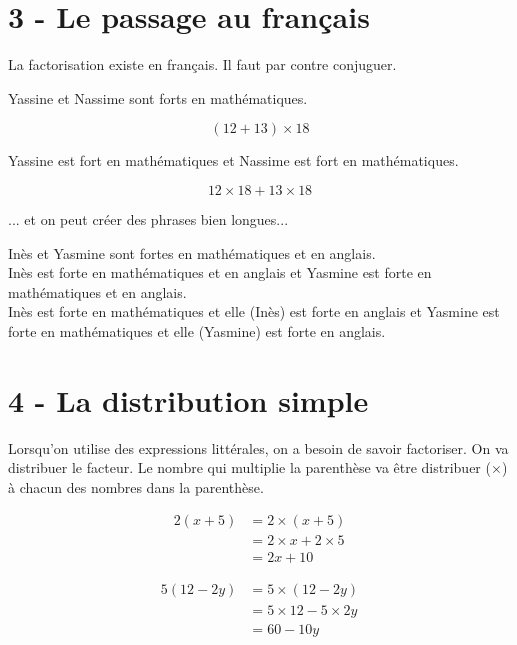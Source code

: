 \documentclass[11pt]{article}
\begin{document}
\section*{3 - Le passage au français}

La factorisation existe en français. Il faut par contre conjuguer.

\begin{center}
  {\selectfont 
  Yassine et Nassime sont forts en mathématiques. 
  }
\end{center}

$$(12 + 13) \times 18$$

\begin{center}
  {\selectfont 
  Yassine est fort en mathématiques et Nassime est fort en mathématiques. 
  }
\end{center}

$$12 \times 18 + 13 \times 18$$

... et on peut créer des phrases bien longues... 

\begin{center}
  {\selectfont 
  Inès et Yasmine sont fortes en mathématiques et en anglais. \\
  Inès est forte en mathématiques et en anglais et Yasmine est forte en mathématiques et en anglais. \\
  Inès est forte en mathématiques et elle (Inès) est forte en anglais et Yasmine est forte en mathématiques et elle (Yasmine) est forte en anglais.  
  }
\end{center}


\section*{4 - La distribution simple}

Lorsqu'on utilise des expressions littérales, on a besoin de savoir factoriser. On va distribuer le facteur. Le nombre qui multiplie la parenthèse va être distribuer ($\times$) à chacun des nombres dans la parenthèse.
\begin{multicols}{2}
\begin{align*}
  2(x + 5 ) &= 2 \times (x + 5 ) \\
            &= 2 \times x + 2 \times 5 \\
            &= 2x + 10
\end{align*}

\begin{align*}
  5(12 -2y) &= 5 \times (12 -2y) \\
            &= 5 \times 12 - 5 \times 2y \\
            &= 60 - 10y
\end{align*}
\end{multicols}
\end{document}

